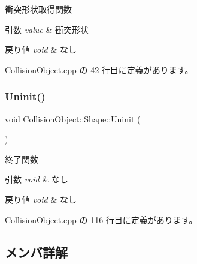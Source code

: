 衝突形状取得関数 


\begin{DoxyParams}{引数}
{\em value} & 衝突形状 \\
\hline
\end{DoxyParams}

\begin{DoxyRetVals}{戻り値}
{\em void} & なし \\
\hline
\end{DoxyRetVals}


 Collision\+Object.\+cpp の 42 行目に定義があります。

\mbox{\label{class_collision_object_1_1_shape_a0190480a97516ac248069d1060e7e57e}} 
\subsubsection{\texorpdfstring{Uninit()}{Uninit()}}
{\footnotesize\ttfamily void Collision\+Object\+::\+Shape\+::\+Uninit (\begin{DoxyParamCaption}{ }\end{DoxyParamCaption})}



終了関数 


\begin{DoxyParams}{引数}
{\em void} & なし \\
\hline
\end{DoxyParams}

\begin{DoxyRetVals}{戻り値}
{\em void} & なし \\
\hline
\end{DoxyRetVals}


 Collision\+Object.\+cpp の 116 行目に定義があります。



\subsection{メンバ詳解}
\mbox{\label{class_collision_object_1_1_shape_a7c2d20af409250b51e425a8aa62766f0}} 
